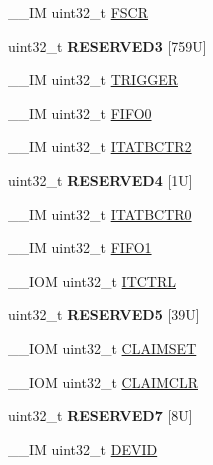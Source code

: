\begin{DoxyCompactItemize}
\+\_\+\+\_\+\+IM uint32\+\_\+t \mbox{\hyperlink{struct_t_p_i___type_a36370b2b0879b7b497f6dd854ba02873}{F\+S\+CR}}
\item 
\mbox{\label{struct_t_p_i___type_a650f89ad335eff97db39beae568590a3}} 
uint32\+\_\+t {\bfseries R\+E\+S\+E\+R\+V\+E\+D3} \mbox{[}759\+U\mbox{]}
\item 
\+\_\+\+\_\+\+IM uint32\+\_\+t \mbox{\hyperlink{struct_t_p_i___type_a5590387d8f44b477fd69951a737b0d7e}{T\+R\+I\+G\+G\+ER}}
\item 
\+\_\+\+\_\+\+IM uint32\+\_\+t \mbox{\hyperlink{struct_t_p_i___type_ace73d78eff029b698e11cd5cf3efaf94}{F\+I\+F\+O0}}
\item 
\+\_\+\+\_\+\+IM uint32\+\_\+t \mbox{\hyperlink{struct_t_p_i___type_a97fb8816ad001f4910de095aa17d9db5}{I\+T\+A\+T\+B\+C\+T\+R2}}
\item 
\mbox{\label{struct_t_p_i___type_a1defe18fe95571e383d754b13d3f6c51}} 
uint32\+\_\+t {\bfseries R\+E\+S\+E\+R\+V\+E\+D4} \mbox{[}1\+U\mbox{]}
\item 
\+\_\+\+\_\+\+IM uint32\+\_\+t \mbox{\hyperlink{struct_t_p_i___type_a9954c088735caa505adc113f6c64d812}{I\+T\+A\+T\+B\+C\+T\+R0}}
\item 
\+\_\+\+\_\+\+IM uint32\+\_\+t \mbox{\hyperlink{struct_t_p_i___type_abad7737b3d46cc6d4813d37171d29745}{F\+I\+F\+O1}}
\item 
\+\_\+\+\_\+\+I\+OM uint32\+\_\+t \mbox{\hyperlink{struct_t_p_i___type_ae6b7f224b1c19c636148f991cc8db611}{I\+T\+C\+T\+RL}}
\item 
\mbox{\label{struct_t_p_i___type_a0be075c11181d8a44c3a019b8690e829}} 
uint32\+\_\+t {\bfseries R\+E\+S\+E\+R\+V\+E\+D5} \mbox{[}39\+U\mbox{]}
\item 
\+\_\+\+\_\+\+I\+OM uint32\+\_\+t \mbox{\hyperlink{struct_t_p_i___type_a974d17c9a0b0b1b894e9707d158b0fbe}{C\+L\+A\+I\+M\+S\+ET}}
\item 
\+\_\+\+\_\+\+I\+OM uint32\+\_\+t \mbox{\hyperlink{struct_t_p_i___type_a1f74caab7b0a7afa848c63ce8ebc6a6f}{C\+L\+A\+I\+M\+C\+LR}}
\item 
\mbox{\label{struct_t_p_i___type_aa0279d9a6b589b11dab6e3d22f87bac8}} 
uint32\+\_\+t {\bfseries R\+E\+S\+E\+R\+V\+E\+D7} \mbox{[}8\+U\mbox{]}
\item 
\+\_\+\+\_\+\+IM uint32\+\_\+t \mbox{\hyperlink{struct_t_p_i___type_aaed316dacef669454fa035e04ee90eca}{D\+E\+V\+ID}}

\end{DoxyCompactItemize}

